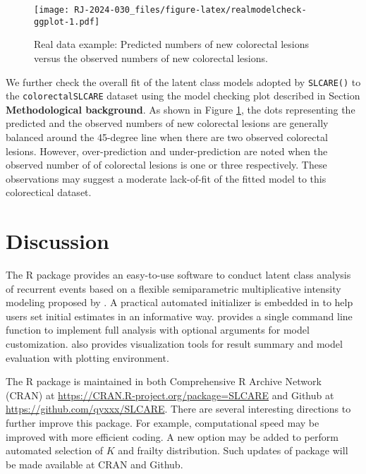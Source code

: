 \begin{figure}
\centering
\texttt{[image: RJ-2024-030\_files/figure-latex/realmodelcheck-ggplot-1.pdf]}
\caption{\label{fig:realmodelcheck-ggplot}Real data example: Predicted numbers of new colorectal lesions versus the observed numbers of new colorectal lesions.}
\end{figure}

We further check the overall fit of the latent class models adopted by \texttt{SLCARE()} to the
\texttt{colorectalSLCARE} dataset using the model checking plot described
in Section \textbf{Methodological background}.
As shown in Figure \ref{fig:realmodelcheck-ggplot}, the dots representing the predicted and the observed numbers of new colorectal lesions are generally balanced around the 45-degree line when there are two observed colorectal lesions. However, over-prediction and under-prediction are noted when the observed number of of colorectal lesions is one or three respectively. These observations may suggest a moderate lack-of-fit of the fitted model to this colorectical dataset.

\hypertarget{discussion}{%
\section{Discussion}\label{discussion}}

The R package  provides an easy-to-use software
to conduct latent class analysis of recurrent events based on a flexible
semiparametric multiplicative intensity modeling proposed by \citet{zhao2022semiparametric}. A practical automated initializer is embedded in  to help users set initial estimates in an informative way.  provides a single command line function to implement full analysis with optional arguments for model customization.  also provides visualization tools for result summary and model evaluation with  plotting environment.

The R package  is maintained in both Comprehensive R Archive Network
(CRAN) at \url{https://CRAN.R-project.org/package=SLCARE} and Github at
\url{https://github.com/qyxxx/SLCARE}. There are several interesting directions to further improve this package. For example, computational speed may be improved with more efficient coding. A new option may be added to perform automated selection of \(K\) and frailty distribution. Such updates of package  will be made available at CRAN and Github.


